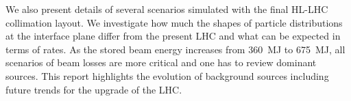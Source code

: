 We also present details of several scenarios simulated with the final HL-LHC collimation layout. We investigate how much the shapes of particle distributions at the interface plane differ from the present LHC and what can be expected in terms of rates. As the stored beam energy increases from 360~MJ to 675~MJ, all scenarios of beam losses are more critical and one has to review dominant sources. This report highlights the evolution of background sources including future trends for the upgrade of the LHC.

